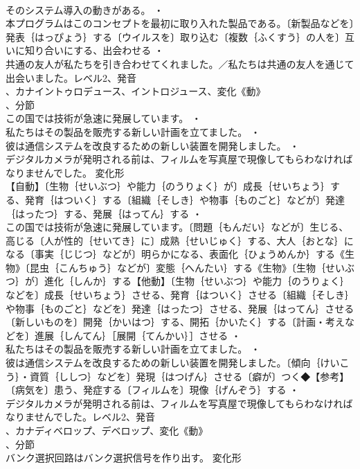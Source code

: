 \documentclass[8pt]{extreport}
\begin{document}
\begin{CJK}{UTF8}{min}
\\	そのシステム導入の動きがある。 ・
\\	本プログラムはこのコンセプトを最初に取り入れた製品である。〔新製品などを〕発表｛はっぴょう｝する〔ウイルスを〕取り込む〔複数｛ふくすう｝の人を〕互いに知り合いにする、出会わせる ・
\\	共通の友人が私たちを引き合わせてくれました。／私たちは共通の友人を通じて出会いました。レベル2、発音
\\	、カナイントゥロデュース、イントロジュース、変化《動》
\\	、分節
\\	この国では技術が急速に発展しています。 ・
\\	私たちはその製品を販売する新しい計画を立てました。 ・
\\	彼は通信システムを改良するための新しい装置を開発しました。 ・
\\	デジタルカメラが発明される前は、フィルムを写真屋で現像してもらわなければなりませんでした。	変化形 
\\	【自動】〔生物｛せいぶつ｝や能力｛のうりょく｝が〕成長｛せいちょう｝する、発育｛はついく｝する〔組織｛そしき｝や物事｛ものごと｝などが〕発達｛はったつ｝する、発展｛はってん｝する ・
\\	この国では技術が急速に発展しています。〔問題｛もんだい｝などが〕生じる、高じる〔人が性的｛せいてき｝に〕成熟｛せいじゅく｝する、大人｛おとな｝になる〔事実｛じじつ｝などが〕明らかになる、表面化｛ひょうめんか｝する《生物》〔昆虫｛こんちゅう｝などが〕変態｛へんたい｝する《生物》〔生物｛せいぶつ｝が〕進化｛しんか｝する【他動】〔生物｛せいぶつ｝や能力｛のうりょく｝などを〕成長｛せいちょう｝させる、発育｛はついく｝させる〔組織｛そしき｝や物事｛ものごと｝などを〕発達｛はったつ｝させる、発展｛はってん｝させる〔新しいものを〕開発｛かいはつ｝する、開拓｛かいたく｝する〔計画・考えなどを〕進展｛しんてん｝［展開｛てんかい｝］させる ・
\\	私たちはその製品を販売する新しい計画を立てました。 ・
\\	彼は通信システムを改良するための新しい装置を開発しました。〔傾向｛けいこう｝・資質｛ししつ｝などを〕発現｛はつげん｝させる〔癖が〕つく◆【参考】
\\	〔病気を〕患う、発症する〔フィルムを〕現像｛げんぞう｝する ・
\\	デジタルカメラが発明される前は、フィルムを写真屋で現像してもらわなければなりませんでした。レベル2、発音
\\	、カナディベロップ、デベロップ、変化《動》
\\	、分節
\\	バンク選択回路はバンク選択信号を作り出す。	変化形 

\end{CJK}
\end{document}
